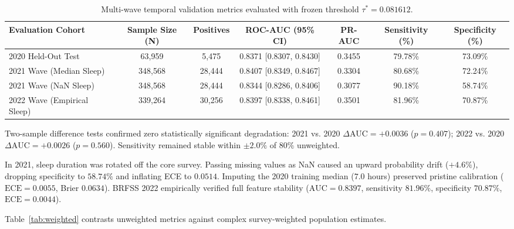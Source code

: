 \documentclass[11pt,a4paper]{article}
\begin{document}
\begin{table}[htbp]
\centering
\small
\caption{Multi-wave temporal validation metrics evaluated with frozen threshold $\tau^* = 0.081612$.}
\label{tab:temporal}
\begin{tabular}{lcccccc}
\toprule
Evaluation Cohort & Sample Size (N) & Positives & ROC-AUC (95\% CI) & PR-AUC & Sensitivity (\%) & Specificity (\%) \\
\midrule
2020 Held-Out Test & 63,959 & 5,475 & 0.8371 [0.8307, 0.8430] & 0.3455 & 79.78\% & 73.09\% \\
2021 Wave (Median Sleep) & 348,568 & 28,444 & 0.8407 [0.8349, 0.8467] & 0.3304 & 80.68\% & 72.24\% \\
2021 Wave (NaN Sleep) & 348,568 & 28,444 & 0.8344 [0.8286, 0.8406] & 0.3077 & 90.18\% & 58.74\% \\
2022 Wave (Empirical Sleep) & 339,264 & 30,256 & 0.8397 [0.8338, 0.8461] & 0.3501 & 81.96\% & 70.87\% \\
\bottomrule
\end{tabular}
\end{table}

Two-sample difference tests confirmed zero statistically significant degradation: 2021 vs. 2020 $\Delta \text{AUC} = +0.0036$ ($p = 0.407$); 2022 vs. 2020 $\Delta \text{AUC} = +0.0026$ ($p = 0.560$). Sensitivity remained stable within $\pm 2.0\%$ of $80\%$ unweighted.

In 2021, sleep duration was rotated off the core survey. Passing missing values as NaN caused an upward probability drift ($+4.6\%$), dropping specificity to $58.74\%$ and inflating ECE to $0.0514$. Imputing the 2020 training median ($7.0$ hours) preserved pristine calibration ($\text{ECE} = 0.0055$, Brier $0.0634$). BRFSS 2022 empirically verified full feature stability ($\text{AUC} = 0.8397$, sensitivity $81.96\%$, specificity $70.87\%$, $\text{ECE} = 0.0044$).

Table~\ref{tab:weighted} contrasts unweighted metrics against complex survey-weighted population estimates.
\end{document}

